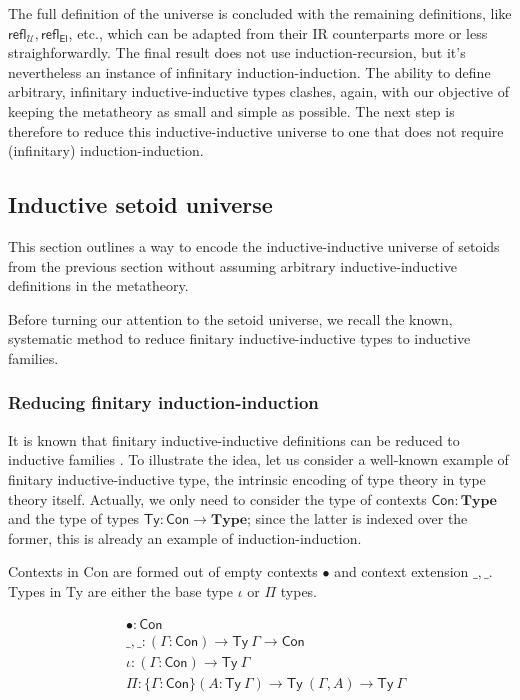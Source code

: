 \documentclass{easychair}
\newcommand{\GG}{\Gamma}
\newcommand{\setoidU}{\mathcal{U}}
\newcommand{\mType}{\mathbf{Type}}
\newcommand{\El}{\textsf{El}}
\newcommand{\reflu}{\textsf{refl}_\setoidU}
\newcommand{\reflel}{\textsf{refl}_\El}
\begin{document}
The full definition of the universe is concluded with the remaining definitions,
like $\reflu, \reflel$, etc., which can be adapted from their IR counterparts
more or less straighforwardly. The final result does not use
induction-recursion, but it's nevertheless an instance of infinitary
induction-induction. The ability to define arbitrary, infinitary
inductive-inductive types clashes, again, with our objective of keeping the
metatheory as small and simple as possible. The next step is therefore to reduce
this inductive-inductive universe to one that does not require (infinitary)
induction-induction.

\subsection{Inductive setoid universe}

This section outlines a way to encode the inductive-inductive universe of
setoids from the previous section without assuming arbitrary inductive-inductive
definitions in the metatheory.

Before turning our attention to the setoid universe, we recall the known,
systematic method to reduce finitary inductive-inductive types to inductive
families.

\subsubsection{Reducing finitary induction-induction}

It is known that finitary inductive-inductive definitions can be reduced to
inductive families \cite{iit-erasure,iit-to-ix,induction-is-enough}.
%
To illustrate the idea, let us consider a well-known example of finitary
inductive-inductive type, the intrinsic encoding of type theory in type theory
itself. Actually, we only need to consider the type of contexts $\textsf{Con} :
\mType$ and the type of types $\textsf{Ty} : \textsf{Con} \to \mType$; since the
latter is indexed over the former, this is already an example of
induction-induction.

Contexts in \textsf{Con} are formed out of empty contexts $\bullet$ and context
extension $\_,\_$. Types in \textsf{Ty} are either the base type $\iota$ or
$\Pi$ types.

\begin{align*}
  & \bullet : \textsf{Con} \\
  & \_,\_ : (\GG : \textsf{Con}) \to \textsf{Ty}\ \GG \to \textsf{Con} \\
  & \iota : (\GG : \textsf{Con}) \to \textsf{Ty}\ \GG \\
  & \Pi : \{\GG : \textsf{Con}\} (A : \textsf{Ty}\ \GG) \to \textsf{Ty}\ (\GG , A) \to \textsf{Ty}\ \GG
\end{align*}
\end{document}
